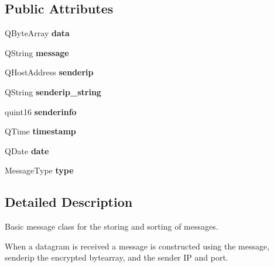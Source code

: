 \subsection*{Public Attributes}
\begin{DoxyCompactItemize}
\item 
\hypertarget{struct_message_a3ef7dc9dd3f7d356f48fe76fd97800a5}{}Q\+Byte\+Array {\bfseries data}\label{struct_message_a3ef7dc9dd3f7d356f48fe76fd97800a5}

\item 
\hypertarget{struct_message_aa1827946747d01ed5ef325cba3d86e1b}{}Q\+String {\bfseries message}\label{struct_message_aa1827946747d01ed5ef325cba3d86e1b}

\item 
\hypertarget{struct_message_a03891c75eb0cdc274337cb2e7ac11031}{}Q\+Host\+Address {\bfseries senderip}\label{struct_message_a03891c75eb0cdc274337cb2e7ac11031}

\item 
\hypertarget{struct_message_a38dbd0cc60b22aeed826ac30e9567da5}{}Q\+String {\bfseries senderip\+\_\+string}\label{struct_message_a38dbd0cc60b22aeed826ac30e9567da5}

\item 
\hypertarget{struct_message_ad1ada733d211a5270a164a1da128f6c0}{}quint16 {\bfseries senderinfo}\label{struct_message_ad1ada733d211a5270a164a1da128f6c0}

\item 
\hypertarget{struct_message_a049ad3d2cc26be505da1f4550805ec55}{}Q\+Time {\bfseries timestamp}\label{struct_message_a049ad3d2cc26be505da1f4550805ec55}

\item 
\hypertarget{struct_message_a037095a68df489f0da05ca6d3494d7d6}{}Q\+Date {\bfseries date}\label{struct_message_a037095a68df489f0da05ca6d3494d7d6}

\item 
\hypertarget{struct_message_a6fc78df47d3755e088e7c658db565fc5}{}Message\+Type {\bfseries type}\label{struct_message_a6fc78df47d3755e088e7c658db565fc5}

\end{DoxyCompactItemize}


\subsection{Detailed Description}
Basic message class for the storing and sorting of messages. 

When a datagram is received a message is constructed using the message, senderip the encrypted bytearray, and the sender I\+P and port.

